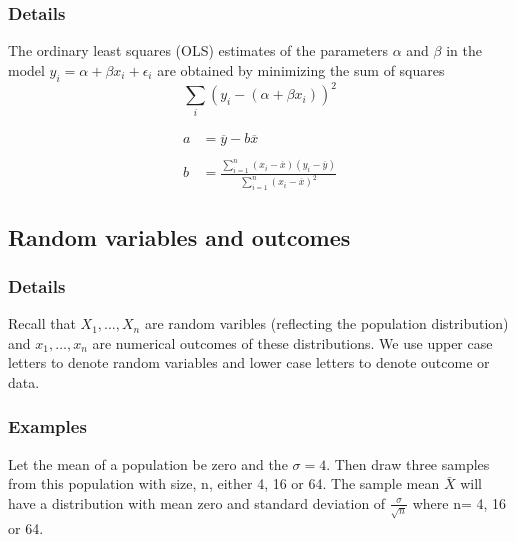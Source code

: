\documentclass[12pt,a4paper]{article}
\theoremstyle{regla}
\theoremstyle{remark}
\theoremstyle{definition}
\theoremstyle{nonumberbreak}
\begin{document}
\subsubsection{Details}
The ordinary least squares (OLS) estimates of the parameters $\alpha$ and $\beta$ in the model $y_i=\alpha + \beta x_i + \epsilon_i$ are 
obtained by minimizing the sum of squares
$$
\sum_i \left ( y_i -(\alpha +\beta x_i)  \right )^2
$$

\begin{align*}
a&=\overline{y} - b\overline{x} \\
\\
b&= \frac{\displaystyle\sum^n_{i=1} (x_i-\overline{x})(y_i-\overline{y})}{\displaystyle\sum^n_{i=1} (x_i-\overline{x})^2}
\end{align*}


\subsection{Random variables and outcomes}
\subsubsection{Details}
Recall that $X_1, \ldots, X_n$ are random varibles (reflecting the population distribution) and $x_1, \ldots, x_n$ are numerical outcomes of these distributions. We use upper case letters to denote random variables and lower case letters to denote outcome or data.
\subsubsection{Examples}
\begin{xmpl}

Let the mean of a population be zero and the $\sigma=4$. Then draw three samples from this population with size, n, either 4, 16 or 64. The sample mean $\bar{X}$ will have a distribution with mean zero and standard deviation of $\frac{\sigma}{\sqrt{n}}$ where n= 4, 16 or 64.
\end{xmpl}

\end{document}
